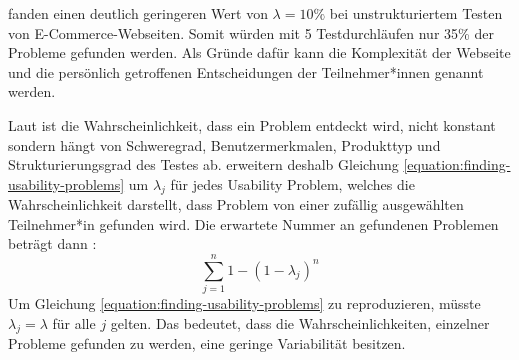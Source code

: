 \citeauthor{spoolTestingWeb2001} fanden einen deutlich geringeren Wert von $\lambda{}=10\%$ bei unstrukturiertem Testen von E-Commerce-Webseiten. Somit würden mit 5 Testdurchläufen nur 35\% der Probleme gefunden werden. Als Gründe dafür kann die Komplexität der Webseite und die persönlich getroffenen Entscheidungen der Teilnehmer*innen genannt werden.
\cite{spoolTestingWeb2001}

Laut \citeauthor{woolrychWhyWhen2001} ist die Wahrscheinlichkeit, dass ein Problem entdeckt wird, nicht konstant sondern hängt von Schweregrad, Benutzermerkmalen, Produkttyp und Strukturierungsgrad des Testes ab. \citeauthor{woolrychWhyWhen2001} erweitern deshalb Gleichung \ref{equation:finding-usability-problems} um $\lambda{}_j$ für jedes Usability Problem, welches die Wahrscheinlichkeit darstellt, dass Problem von einer zufällig ausgewählten Teilnehmer*in gefunden wird. Die erwartete Nummer an gefundenen Problemen beträgt dann \cite{woolrychWhyWhen2001}:
\begin{equation}
 \sum_{j=1}^n 1-(1-\lambda{}_j)^n
\end{equation}
Um Gleichung \ref{equation:finding-usability-problems} zu reproduzieren, müsste $\lambda{}_j = \lambda{}$ für alle $j$ gelten. Das bedeutet, dass die Wahrscheinlichkeiten, einzelner Probleme gefunden zu werden, eine geringe Variabilität besitzen. 
\cite{woolrychWhyWhen2001}
